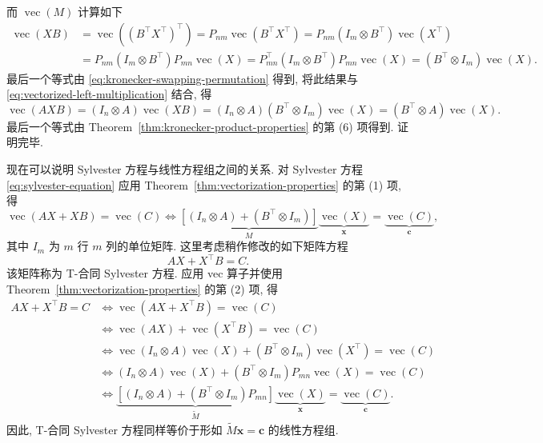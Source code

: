 \begin{Proof}
\begin{equation}
\end{equation}
{而 $\operatorname{vec}(M)$ 计算如下}
\[\begin{aligned}
\operatorname{vec}(XB)&=\operatorname{vec}((B^{\top}X^{\top})^{\top})=P_{nm}\operatorname{vec}(B^{\top}X^{\top})=P_{nm}(I_m\otimes B^{\top})\operatorname{vec}(X^{\top})\\
&=P_{nm}(I_m\otimes B^{\top})P_{mn}\operatorname{vec}(X)
=P_{mn}^{\top}(I_m\otimes B^{\top})P_{mn}\operatorname{vec}(X)=(B^{\top}\otimes I_m)\operatorname{vec}(X).
\end{aligned}\]
{最后一个等式由 \eqref{eq:kronecker-swapping-permutation} 得到, 将此结果与 \eqref{eq:vectorized-left-multiplication} 结合, 得}
\[\operatorname{vec}(AXB)=(I_n\otimes A)\operatorname{vec}(XB)=(I_n\otimes A)(B^{\top}\otimes I_m)\operatorname{vec}(X)=(B^{\top}\otimes A)\operatorname{vec}(X).\]
{最后一个等式由 Theorem\ \ref{thm:kronecker-product-properties} 的第 (6) 项得到. 证明完毕.}
\end{Proof}
{现在可以说明 Sylvester 方程与线性方程组之间的关系. 对 Sylvester 方程 \eqref{eq:sylvester-equation} 应用 Theorem\ \ref{thm:vectorization-properties} 的第 (1) 项, 得}
\[\operatorname{vec}(AX+XB)=\operatorname{vec}(C)\Leftrightarrow
\underbrace{[(I_n\otimes A)+(B^{\top}\otimes I_m)]}_M
\underbrace{\operatorname{vec}(X)}_{\boldsymbol{x}}=\underbrace{\operatorname{vec}(C)}_{\boldsymbol{c}},\]
{其中 $I_m$ 为 $m$ 行 $m$ 列的单位矩阵. 这里考虑稍作修改的如下矩阵方程}
\[AX+X^{\top}B=C.\]
{该矩阵称为 T-合同 Sylvester 方程. 应用 vec 算子并使用 Theorem\ \ref{thm:vectorization-properties} 的第 (2) 项, 得}
\[\begin{aligned}
AX+X^{\top}B=C&\Leftrightarrow\operatorname{vec}(AX+X^{\top}B)=\operatorname{vec}(C)\\
&\Leftrightarrow\operatorname{vec}(AX)+\operatorname{vec}(X^{\top}B)=\operatorname{vec}(C)\\
&\Leftrightarrow\operatorname{vec}(I_n\otimes A)\operatorname{vec}(X)+(B^{\top}\otimes I_m)\operatorname{vec}(X^{\top})=\operatorname{vec}(C)\\
&\Leftrightarrow(I_n\otimes A)\operatorname{vec}(X)+(B^{\top}\otimes I_m)P_{mn}\operatorname{vec}(X)=\operatorname{vec}(C)\\
&\Leftrightarrow\underbrace{[(I_n\otimes A)+(B^{\top}\otimes I_m)P_{mn}]}_{\widetilde M}\underbrace{\operatorname{vec}(X)}_{\boldsymbol{x}}=\underbrace{\operatorname{vec}(C)}_{\boldsymbol{c}}.
\end{aligned}\]
{因此, T-合同 Sylvester 方程同样等价于形如 $\widetilde M\boldsymbol{x}=\boldsymbol{c}$ 的线性方程组.}
